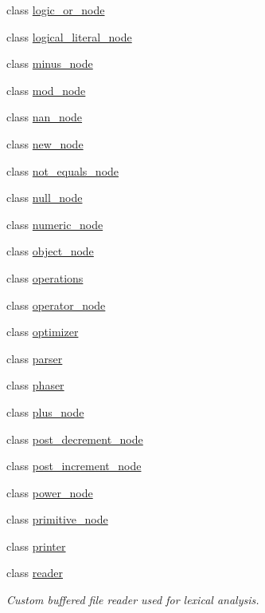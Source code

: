 \begin{DoxyCompactItemize}
\item 
class \hyperlink{classjawe_1_1logic__or__node}{logic\+\_\+or\+\_\+node}
\item 
class \hyperlink{classjawe_1_1logical__literal__node}{logical\+\_\+literal\+\_\+node}
\item 
class \hyperlink{classjawe_1_1minus__node}{minus\+\_\+node}
\item 
class \hyperlink{classjawe_1_1mod__node}{mod\+\_\+node}
\item 
class \hyperlink{classjawe_1_1nan__node}{nan\+\_\+node}
\item 
class \hyperlink{classjawe_1_1new__node}{new\+\_\+node}
\item 
class \hyperlink{classjawe_1_1not__equals__node}{not\+\_\+equals\+\_\+node}
\item 
class \hyperlink{classjawe_1_1null__node}{null\+\_\+node}
\item 
class \hyperlink{classjawe_1_1numeric__node}{numeric\+\_\+node}
\item 
class \hyperlink{classjawe_1_1object__node}{object\+\_\+node}
\item 
class \hyperlink{classjawe_1_1operations}{operations}
\item 
class \hyperlink{classjawe_1_1operator__node}{operator\+\_\+node}
\item 
class \hyperlink{classjawe_1_1optimizer}{optimizer}
\item 
class \hyperlink{classjawe_1_1parser}{parser}
\item 
class \hyperlink{classjawe_1_1phaser}{phaser}
\item 
class \hyperlink{classjawe_1_1plus__node}{plus\+\_\+node}
\item 
class \hyperlink{classjawe_1_1post__decrement__node}{post\+\_\+decrement\+\_\+node}
\item 
class \hyperlink{classjawe_1_1post__increment__node}{post\+\_\+increment\+\_\+node}
\item 
class \hyperlink{classjawe_1_1power__node}{power\+\_\+node}
\item 
class \hyperlink{classjawe_1_1primitive__node}{primitive\+\_\+node}
\item 
class \hyperlink{classjawe_1_1printer}{printer}
\item 
class \hyperlink{classjawe_1_1reader}{reader}
\begin{DoxyCompactList}\small\item\em Custom buffered file reader used for lexical analysis. \end{DoxyCompactList}\item 

\end{DoxyCompactItemize}

